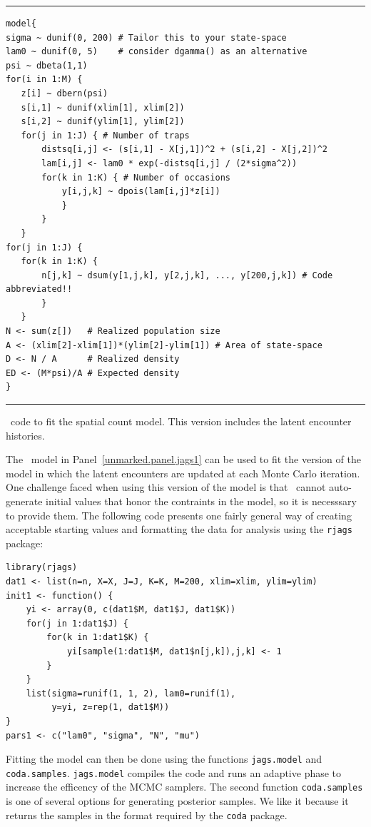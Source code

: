 \begin{panel}
\centering
\rule[0.05in]{\textwidth}{.03in}
\begin{small}
\begin{verbatim}
model{
sigma ~ dunif(0, 200) # Tailor this to your state-space
lam0 ~ dunif(0, 5)    # consider dgamma() as an alternative
psi ~ dbeta(1,1)
for(i in 1:M) {
   z[i] ~ dbern(psi)
   s[i,1] ~ dunif(xlim[1], xlim[2])
   s[i,2] ~ dunif(ylim[1], ylim[2])
   for(j in 1:J) { # Number of traps
       distsq[i,j] <- (s[i,1] - X[j,1])^2 + (s[i,2] - X[j,2])^2
       lam[i,j] <- lam0 * exp(-distsq[i,j] / (2*sigma^2))
       for(k in 1:K) { # Number of occasions
           y[i,j,k] ~ dpois(lam[i,j]*z[i])
           }
       }
   }
for(j in 1:J) {
   for(k in 1:K) {
       n[j,k] ~ dsum(y[1,j,k], y[2,j,k], ..., y[200,j,k]) # Code abbreviated!!
       }
   }
N <- sum(z[])   # Realized population size
A <- (xlim[2]-xlim[1])*(ylim[2]-ylim[1]) # Area of state-space
D <- N / A      # Realized density
ED <- (M*psi)/A # Expected density
}
\end{verbatim}
\end{small}
\rule[0.15in]{\textwidth}{.03in}
\caption{\jags~code to fit the spatial count model. This version
  includes the latent encounter histories.}
\label{unmarked.panel.jags1}
\end{panel}

The \jags~model in Panel~\ref{unmarked.panel.jags1} can be used to
fit the version of the model in which the latent encounters are
updated at each Monte Carlo iteration. One challenge faced when using
this version of the model is that \jags~cannot auto-generate initial values
that honor the contraints in the model, so it is necesssary to provide
them. The following code presents one fairly general way of creating
acceptable starting values and formatting the data for analysis using
the \texttt{rjags} package:
\begin{small}
\begin{verbatim}
library(rjags)
dat1 <- list(n=n, X=X, J=J, K=K, M=200, xlim=xlim, ylim=ylim)
init1 <- function() {
    yi <- array(0, c(dat1$M, dat1$J, dat1$K))
    for(j in 1:dat1$J) {
        for(k in 1:dat1$K) {
            yi[sample(1:dat1$M, dat1$n[j,k]),j,k] <- 1
        }
    }
    list(sigma=runif(1, 1, 2), lam0=runif(1),
         y=yi, z=rep(1, dat1$M))
}
pars1 <- c("lam0", "sigma", "N", "mu")
\end{verbatim}
\end{small}
Fitting the model can then be done using the functions
\verb+jags.model+ and \verb+coda.samples+.
\verb+jags.model+ compiles the code and runs an adaptive phase to
increase the efficency of the MCMC samplers. The second function
\verb+coda.samples+ is one of several options for generating
posterior samples. We like it because it returns the samples in the
format required by the \texttt{coda} package.

